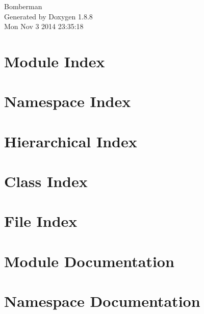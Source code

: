 \documentclass[twoside]{book}
\newcommand{\+}{\discretionary{\mbox{\scriptsize$\hookleftarrow$}}{}{}}
\newcommand{\clearemptydoublepage}{%
  \newpage{\pagestyle{empty}\cleardoublepage}%
}
\begin{document}
\hypersetup{pageanchor=false,
             bookmarks=true,
             bookmarksnumbered=true,
             pdfencoding=unicode
            }
\begin{titlepage}
\vspace*{7cm}
\begin{center}%
{\Large Bomberman }\\
\vspace*{1cm}
{\large Generated by Doxygen 1.8.8}\\
\vspace*{0.5cm}
{\small Mon Nov 3 2014 23:35:18}\\
\end{center}
\end{titlepage}
\clearemptydoublepage
\tableofcontents
\clearemptydoublepage
{}
\hypersetup{pageanchor=true}

\chapter{Module Index}

\chapter{Namespace Index}

\chapter{Hierarchical Index}

\chapter{Class Index}

\chapter{File Index}

\chapter{Module Documentation}




\chapter{Namespace Documentation}









\end{document}
